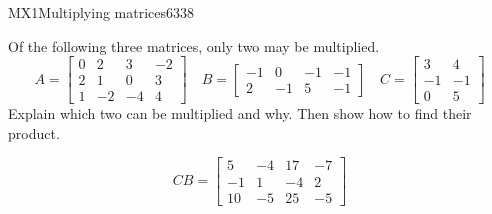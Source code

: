 \begin{exercise}{MX1}{Multiplying matrices}{6338} 
\begin{exerciseStatement} 

Of the following three matrices, only two may be multiplied. \[
          A=\left[\begin{array}{cccc}
0 & 2 & 3 & -2 \\
2 & 1 & 0 & 3 \\
1 & -2 & -4 & 4
\end{array}\right] \hspace{1em} B=\left[\begin{array}{cccc}
-1 & 0 & -1 & -1 \\
2 & -1 & 5 & -1
\end{array}\right] \hspace{1em} C=\left[\begin{array}{cc}
3 & 4 \\
-1 & -1 \\
0 & 5
\end{array}\right]
      \] Explain which two can be multiplied and why. Then show how to find their product.

 \end{exerciseStatement}
 \begin{exerciseAnswer} \[CB=\left[\begin{array}{cccc}
5 & -4 & 17 & -7 \\
-1 & 1 & -4 & 2 \\
10 & -5 & 25 & -5
\end{array}\right]\] \end{exerciseAnswer}
 \end{exercise}


